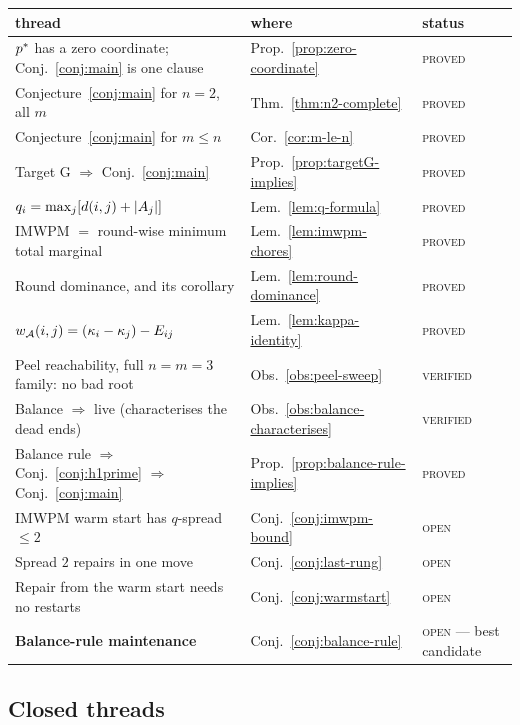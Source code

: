 \begin{center}\small
\begin{tabular}{@{}p{}p{}p{}@{}}
\toprule
thread & where & status \\
\midrule
$p^{*}$ has a zero coordinate; Conj.~\ref{conj:main} is one clause
  & Prop.~\ref{prop:zero-coordinate} & \textsc{proved} \\
Conjecture~\ref{conj:main} for $n = 2$, all $m$
  & Thm.~\ref{thm:n2-complete} & \textsc{proved} \\
Conjecture~\ref{conj:main} for $m \le n$
  & Cor.~\ref{cor:m-le-n} & \textsc{proved} \\
Target G $\Rightarrow$ Conj.~\ref{conj:main}
  & Prop.~\ref{prop:targetG-implies} & \textsc{proved} \\
$q_i = \max_j[d(i,j) + \left\lvert A_{j}\right\rvert]$
  & Lem.~\ref{lem:q-formula} & \textsc{proved} \\
IMWPM $=$ round-wise minimum total marginal
  & Lem.~\ref{lem:imwpm-chores} & \textsc{proved} \\
Round dominance, and its corollary
  & Lem.~\ref{lem:round-dominance} & \textsc{proved} \\
$w_{\mathcal{A}}(i,j) = (\kappa_i-\kappa_j) - E_{ij}$
  & Lem.~\ref{lem:kappa-identity} & \textsc{proved} \\
Peel reachability, full $n=m=3$ family: no bad root
  & Obs.~\ref{obs:peel-sweep} & \textsc{verified} \\
Balance $\Rightarrow$ live (characterises the dead ends)
  & Obs.~\ref{obs:balance-characterises} & \textsc{verified} \\
Balance rule $\Rightarrow$ Conj.~\ref{conj:h1prime} $\Rightarrow$ Conj.~\ref{conj:main}
  & Prop.~\ref{prop:balance-rule-implies} & \textsc{proved} \\
\midrule
IMWPM warm start has $q$-spread $\le 2$
  & Conj.~\ref{conj:imwpm-bound} & \textsc{open} \\
Spread $2$ repairs in one move
  & Conj.~\ref{conj:last-rung} & \textsc{open} \\
Repair from the warm start needs no restarts
  & Conj.~\ref{conj:warmstart} & \textsc{open} \\
\textbf{Balance-rule maintenance}
  & Conj.~\ref{conj:balance-rule} & \textsc{open} --- best candidate \\
\bottomrule
\end{tabular}
\end{center}

\subsection*{Closed threads}

